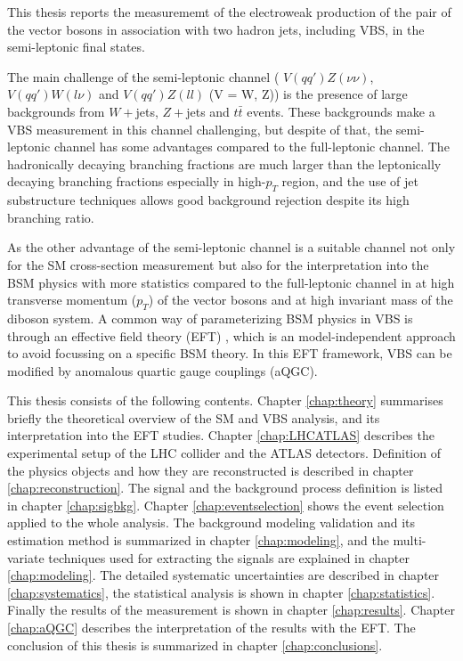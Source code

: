 %
This thesis reports the measurememt of the electroweak production of the pair of the vector bosons in association with two hadron jets, including VBS, in the semi-leptonic final states.

The main challenge of the semi-leptonic channel ( $V(qq')Z(\nu\nu)$, $V(qq')W(l\nu)$ and $V(qq')Z(ll)$ (V = W, Z)) is the presence of large backgrounds from $W + $jets, $Z + $jets and $t\bar{t}$ events. 
These backgrounds make a VBS measurement in this channel challenging, but despite of that, the semi-leptonic channel has some advantages compared to the full-leptonic channel. 
The hadronically decaying branching fractions are much larger than the leptonically decaying branching fractions especially in high-$p_T$ region, and the use of jet substructure techniques allows good background rejection despite its high branching ratio. 

As the other advantage of the semi-leptonic channel is a suitable channel not only for the SM cross-section measurement but also for the interpretation into the BSM physics with more statistics compared to the full-leptonic channel in at high transverse momentum ($p_T$) of the vector bosons and at high invariant mass of the diboson system.
A common way of parameterizing BSM physics in VBS is through an effective field theory (EFT) \cite{Longhitano:1980tm}, which is an model-independent approach to avoid focussing on a specific BSM theory. In this EFT framework, VBS can be modified by anomalous quartic gauge couplings (aQGC). 


This thesis consists of the following contents.
Chapter \ref{chap:theory} summarises briefly the theoretical overview of the SM and VBS analysis, and its interpretation into the EFT studies. 
Chapter \ref{chap:LHCATLAS} describes the experimental setup of the LHC collider and the ATLAS detectors. 
Definition of the physics objects and how they are reconstructed is described in chapter \ref{chap:reconstruction}. 
The signal and the background process definition is listed in chapter \ref{chap:sigbkg}. Chapter \ref{chap:eventselection} shows the event selection applied to the whole analysis.
The background modeling validation and its estimation method is summarized in chapter \ref{chap:modeling}, and the multi-variate techniques used for extracting the signals are explained in chapter \ref{chap:modeling}. The detailed systematic uncertainties are described in chapter \ref{chap:systematics}, the statistical analysis is shown in chapter \ref{chap:statistics}. Finally the results of the measurement is shown in chapter \ref{chap:results}. Chapter \ref{chap:aQGC} describes the interpretation of the results with the EFT. The conclusion of this thesis is summarized in chapter \ref{chap:conclusions}.
